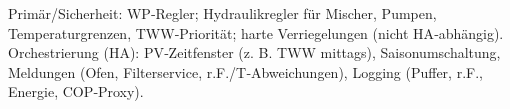 \markdownRendererUlEndTight \markdownRendererInterblockSeparator
{}
\markdownRendererSectionEnd \markdownRendererSectionBegin
{}\markdownRendererInterblockSeparator
{}\markdownRendererUlBeginTight
\markdownRendererUlItem Primär/Sicherheit: WP‑Regler; Hydraulikregler für Mischer, Pumpen, Temperaturgrenzen, TWW‑Priorität; harte Verriegelungen (nicht HA‑abhängig).\markdownRendererUlItemEnd 
\markdownRendererUlItem Orchestrierung (HA): PV‑Zeitfenster (z. B. TWW mittags), Saisonumschaltung, Meldungen (Ofen, Filterservice, r.F./T‑Abweichungen), Logging (Puffer, r.F., Energie, COP‑Proxy).\markdownRendererUlItemEnd 
\markdownRendererUlEndTight 
\markdownRendererSectionEnd 
\markdownRendererSectionEnd \markdownRendererDocumentEnd